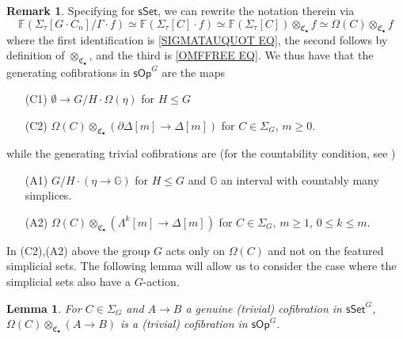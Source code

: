 \documentclass[a4paper,10pt]{article}%
\numberwithin{equation}{section}
\numberwithin{figure}{section}
\newtheorem{lemma}[equation]{Lemma}%
\theoremstyle{definition} %
\newtheorem{remark}[equation]{Remark}%
\newcommand{\sSet}{\ensuremath{\mathsf{sSet}}}%
\newcommand{\sOp}{\ensuremath{\mathsf{sOp}}}%
\newcommand{\1}{\ensuremath{\mathbbm 1}}%
\begin{document}
\begin{remark}
	Specifying \cite[Def. 4.19]{BP_HGOP}
	for $\mathsf{sSet}$, we can rewrite the notation therein via
\[
	\mathbb{F}
	\left(\Sigma_{\tau}[G \cdot C_{n}]/\Gamma \cdot f\right)
\simeq
	\mathbb{F}
	\left(\Sigma_{\tau}[C] \cdot f\right)
\simeq
	\mathbb{F}
	\left(\Sigma_{\tau}[C] \right) \otimes_{\mathfrak{C}_{\bullet}} f
\simeq 
	\Omega(C) \otimes_{\mathfrak{C}_{\bullet}} f
\]
where the first identification is
\eqref{SIGMATAUQUOT EQ},
the second follows by definition of
$\otimes_{\mathfrak{C}_{\bullet}}$,
and the third is \eqref{OMFFREE EQ}.
We thus have that the generating cofibrations in $\mathsf{sOp}^G$
are the maps
	\begin{itemize}
		\item[(C1)] $\emptyset \to G/H \cdot \Omega(\eta)$ for $H \leq G$
		\item[(C2)] $\Omega(C) \otimes_{\mathfrak{C}_{\bullet}} (\partial \Delta[m] \to \Delta[m])$
		for $C \in \Sigma_G$, $m \geq 0$.
	\end{itemize}
	while the generating trivial cofibrations are 
	(for the countability condition, see \cite[Rem. 4.17]{BP_HGOP})
	\begin{itemize}
		\item[(A1)] 
		$G/H \cdot \left(\eta \to \mathbb{G}\right)$ 
		for $H \leq G$ and $\mathbb G$ an interval with countably many simplices.
		\item[(A2)] 
		$\Omega(C) \otimes_{\mathfrak{C}_{\bullet}} (\Lambda^k[m] \to \Delta[m])$
		for $C \in \Sigma_G$, $m \geq 1$, $0 \leq k \leq m$.
	\end{itemize}
\end{remark}

In (C2),(A2) above 
the group $G$ acts only on $\Omega(C)$
and not on the featured simplicial sets.
The following lemma will allow us to consider the case where the simplicial sets also have a $G$-action.

\begin{lemma}
	\label{OPTENSCOF_LEM}
	For $C \in \Sigma_G$ and $A \to B$ a genuine (trivial) cofibration in $\sSet^G$,
	$\Omega(C) \otimes_{\mathfrak{C}_{\bullet}} (A \to B)$ is a (trivial) cofibration in $\sOp^G$.
\end{lemma}
\end{document}
